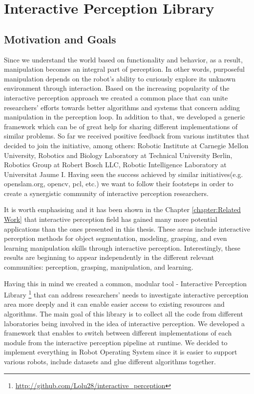 \chapter{Interactive Perception Library}
\label{chapter:Interactive Perception Library}


\section{Motivation and Goals}
Since we understand the world based on functionality and behavior, as a result, manipulation becomes an integral part of perception. In other words, purposeful manipulation depends on the robot's ability to curiously explore its unknown environment through interaction. Based on the increasing popularity of the interactive perception approach we created a common place that can unite researchers' efforts towards better algorithms and systems that concern adding manipulation in the perception loop. In addition to that, we developed a generic framework which can be of great help for sharing different implementations of similar problems. So far we received positive feedback from various institutes that decided to join the initiative, among others: Robotic Institute at Carnegie Mellon University, Robotics and Biology Laboratory at Technical University Berlin, Robotics Group at Robert Bosch LLC, Robotic Intelligence Laboratory at Universitat Jaume I. Having seen the success achieved by similar initiatives(e.g. openslam.org, opencv, pcl, etc.) we want to follow their footsteps in order to create a synergistic community of interactive perception researchers.

It is worth emphasising and it has been shown in the Chapter \ref{chapter:Related Work} that interactive perception field has gained many more potential applications than the ones presented in this thesis. These areas include interactive perception methods for object segmentation, modeling, grasping, and even learning manipulation skills through interactive perception. Interestingly, these results are beginning to appear independently in the different relevant communities: perception, grasping, manipulation, and learning.

Having this in mind we created a common, modular tool - Interactive Perception Library \footnote{\url{http://github.com/Lolu28/interactive_perception}} that can address researchers' needs to investigate interactive perception area more deeply and it can enable easier access to existing resources and algorithms. The main goal of this library is to collect all the code from different laboratories being involved in the idea of interactive perception. We developed a framework that enables to switch between different implementations of each module from the interactive perception pipeline at runtime. We decided to implement everything in Robot Operating System since it is easier to support various robots, include datasets and glue different algorithms together. 


